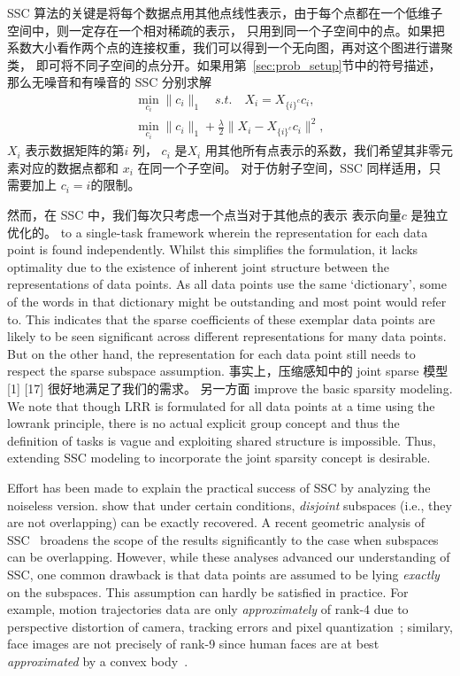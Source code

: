 \documentclass{ctexart}
\begin{document}
SSC
算法的关键是将每个数据点用其他点线性表示，由于每个点都在一个低维子空间中，则一定存在一个相对稀疏的表示，
只用到同一个子空间中的点。如果把系数大小看作两个点的连接权重，我们可以得到一个无向图，再对这个图进行谱聚类，
即可将不同子空间的点分开。如果用第~\ref{sec:prob_setup}节中的符号描述，那么无噪音和有噪音的 SSC 分别求解
\begin{align*}
  \min_{c_i} \|c_i\|_1\quad s.t.\quad X_i=X_{\{i\}^c}c_i, \\
  \min_{c_i} \|c_i\|_1+\frac{\lambda}{2}\|X_i-X_{\{i\}^c}c_i\|^2,
\end{align*}
$X_i$ 表示数据矩阵的第$i$ 列， $c_i$ 是$X_i$ 用其他所有点表示的系数，我们希望其非零元素对应的数据点都和 $x_i$ 在同一个子空间。
对于仿射子空间，SSC 同样适用，只需要加上 $c_i = i$的限制。

然而，在 SSC 中，我们每次只考虑一个点当对于其他点的表示
表示向量$c$ 是独立优化的。
to a single-task framework wherein the representation for
each data point is found independently. Whilst this simplifies
the formulation, it lacks optimality due to the existence of
inherent joint structure between the representations of data
points. As all data points use the same ‘dictionary’, some
of the words in that dictionary might be outstanding and
most point would refer to. This indicates that the sparse
coefficients of these exemplar data points are likely to be
seen significant across different representations for many
data points. But on the other hand, the representation for
each data point still needs to respect the sparse subspace
assumption. 事实上，压缩感知中的 joint sparse 模型[1]  [17] 很好地满足了我们的需求。
另一方面
improve the basic sparsity modeling. We note that though
LRR is formulated for all data points at a time using the lowrank
principle, there is no actual explicit group concept and
thus the definition of tasks is vague and exploiting shared
structure is impossible. Thus, extending SSC modeling to
incorporate the joint sparsity concept is desirable.

Effort has been made to explain the practical success of SSC by analyzing the noiseless version. \cite{elhamifar2010ssc_icassp} show that under certain conditions, \emph{disjoint} subspaces (i.e., they are not overlapping) can be exactly recovered.
A recent geometric analysis of SSC~\cite{soltanolkotabi2011geometric} broadens the scope of the results significantly to the case when subspaces can be overlapping. However, while these analyses advanced our understanding of SSC, one common drawback
is that data points are assumed to be lying {\em exactly} on the subspaces. This assumption can hardly be satisfied in practice. For example, motion trajectories data are only {\em approximately} of rank-4 due to perspective distortion of camera, tracking errors and pixel quantization~\cite{costeira1998motion_seg}; similary, face images are   not precisely of rank-9 since human faces are at best {\em approximated} by a convex body~\cite{basri2003lambertianface}.
\end{document}
